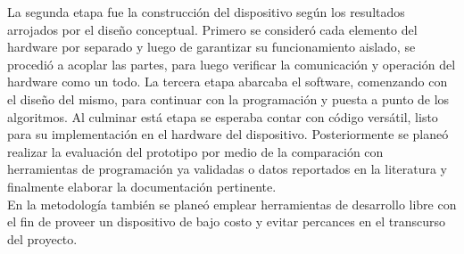 \documentclass[11pt,lettersize]{article} %
\begin{document}
La segunda etapa fue la construcción del dispositivo según los resultados arrojados por el diseño conceptual. Primero se consideró cada elemento del hardware por separado y luego de garantizar su funcionamiento aislado, se procedió a acoplar las partes, para luego verificar la comunicación y operación del hardware como un todo. La tercera etapa abarcaba el software, comenzando con el diseño del mismo, para continuar con la programación y puesta a punto de los algoritmos. Al culminar está etapa se esperaba contar con código versátil, listo para su implementación en el hardware del dispositivo. Posteriormente se planeó realizar la evaluación del prototipo por medio de la comparación con herramientas de programación ya validadas o datos reportados en la literatura y finalmente elaborar la documentación pertinente.\\

En la metodología también se planeó emplear herramientas de desarrollo libre con el fin de proveer un dispositivo de bajo costo y evitar percances en el transcurso del proyecto.\\
\end{document}
